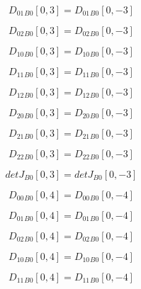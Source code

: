 \documentclass{article}
\begin{document}
\begin{dmath}{D_{01}{_{B0}}}[{0,3}] = {D_{01}{_{B0}}}[{0,-3}]\end{dmath}

\begin{dmath}{D_{02}{_{B0}}}[{0,3}] = {D_{02}{_{B0}}}[{0,-3}]\end{dmath}

\begin{dmath}{D_{10}{_{B0}}}[{0,3}] = {D_{10}{_{B0}}}[{0,-3}]\end{dmath}

\begin{dmath}{D_{11}{_{B0}}}[{0,3}] = {D_{11}{_{B0}}}[{0,-3}]\end{dmath}

\begin{dmath}{D_{12}{_{B0}}}[{0,3}] = {D_{12}{_{B0}}}[{0,-3}]\end{dmath}

\begin{dmath}{D_{20}{_{B0}}}[{0,3}] = {D_{20}{_{B0}}}[{0,-3}]\end{dmath}

\begin{dmath}{D_{21}{_{B0}}}[{0,3}] = {D_{21}{_{B0}}}[{0,-3}]\end{dmath}

\begin{dmath}{D_{22}{_{B0}}}[{0,3}] = {D_{22}{_{B0}}}[{0,-3}]\end{dmath}

\begin{dmath}{detJ{_{B0}}}[{0,3}] = {detJ{_{B0}}}[{0,-3}]\end{dmath}

\begin{dmath}{D_{00}{_{B0}}}[{0,4}] = {D_{00}{_{B0}}}[{0,-4}]\end{dmath}

\begin{dmath}{D_{01}{_{B0}}}[{0,4}] = {D_{01}{_{B0}}}[{0,-4}]\end{dmath}

\begin{dmath}{D_{02}{_{B0}}}[{0,4}] = {D_{02}{_{B0}}}[{0,-4}]\end{dmath}

\begin{dmath}{D_{10}{_{B0}}}[{0,4}] = {D_{10}{_{B0}}}[{0,-4}]\end{dmath}

\begin{dmath}{D_{11}{_{B0}}}[{0,4}] = {D_{11}{_{B0}}}[{0,-4}]\end{dmath}
\end{document}

